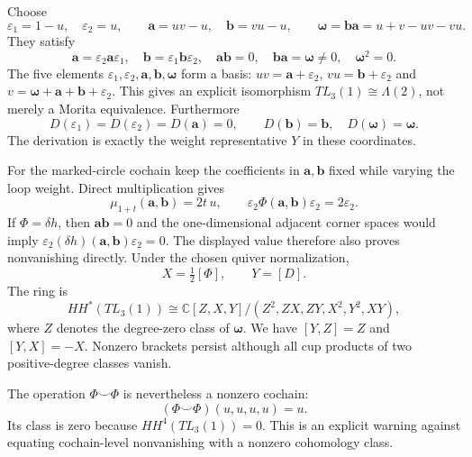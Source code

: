 \documentclass[a4paper,11pt,oneside,reqno]{amsart}
\theoremstyle{definition}
\numberwithin{equation}{section}
\begin{document}
	Choose
	\[
	\varepsilon_1=1-u,\quad\varepsilon_2=u,
	\qquad \mathbf{a}=uv-u,\quad \mathbf{b}=vu-u,
	\qquad \boldsymbol{\omega}=\mathbf{b}\mathbf{a}=u+v-uv-vu.
	\]
	They satisfy
	\[
	\mathbf{a}=\varepsilon_2\mathbf{a}\varepsilon_1,\quad
	\mathbf{b}=\varepsilon_1\mathbf{b}\varepsilon_2,\quad
	\mathbf{a}\mathbf{b}=0,\quad \mathbf{b}\mathbf{a}=\boldsymbol{\omega}\ne0,\quad \boldsymbol{\omega}^2=0.
	\]
	The five elements $\varepsilon_1,\varepsilon_2,\mathbf{a},\mathbf{b},\boldsymbol{\omega}$ form a
	basis: $uv=\mathbf{a}+\varepsilon_2$, $vu=\mathbf{b}+\varepsilon_2$ and
	$v=\boldsymbol{\omega}+\mathbf{a}+\mathbf{b}+\varepsilon_2$.  This gives an explicit isomorphism
	$TL_3(1)\cong\Lambda(2)$, not merely a Morita equivalence.
	Furthermore
	\[
	D(\varepsilon_1)=D(\varepsilon_2)=D(\mathbf{a})=0,
	\qquad D(\mathbf{b})=\mathbf{b},\quad D(\boldsymbol{\omega})=\boldsymbol{\omega}.
	\]
	The derivation is exactly the weight representative $Y$ in these
	coordinates.
	
	For the marked-circle cochain keep the coefficients in $\mathbf{a},\mathbf{b}$ fixed
	while varying the loop weight.  Direct multiplication gives
	\[
	\mu_{1+t}(\mathbf{a},\mathbf{b})=2t\,u,
	\qquad \varepsilon_2\Phi(\mathbf{a},\mathbf{b})\varepsilon_2=2\varepsilon_2.
	\]
	If $\Phi=\delta h$, then $\mathbf{a}\mathbf{b}=0$ and the one-dimensional adjacent
	corner spaces would imply
	$\varepsilon_2(\delta h)(\mathbf{a},\mathbf{b})\varepsilon_2=0$.
	The displayed value therefore also proves nonvanishing directly.
	Under the chosen quiver normalization,
	\[
	X=\tfrac12[\Phi],\qquad Y=[D].
	\]
	The ring is
	\[
	HH^*(TL_3(1))\cong
	\mathbb C[Z,X,Y]/(Z^2,ZX,ZY,X^2,Y^2,XY),
	\]
	where $Z$ denotes the degree-zero class of $\boldsymbol{\omega}$.  We have $[Y,Z]=Z$ and $[Y,X]=-X$.  Nonzero brackets persist although
	all cup products of two positive-degree classes vanish.
	
	The operation $\Phi\smile\Phi$ is nevertheless a nonzero cochain:
	\[
	(\Phi\smile\Phi)(u,u,u,u)=u.
	\]
	Its class is zero because $HH^4(TL_3(1))=0$.  This is an explicit
	warning against equating cochain-level nonvanishing with a nonzero
	cohomology class.
	
\end{document}
